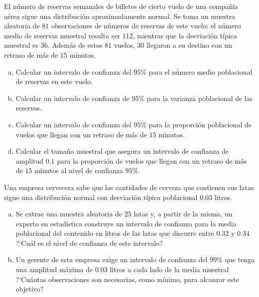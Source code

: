 \documentclass[12pt]{article}
\begin{document}
\begin{prob}
El número de reservas semanales de billetes de cierto vuelo de una compañía aérea sigue una
distribución aproximadamente normal. Se toma un muestra aleatoria de $81$ observaciones de
números de reservas de este vuelo: el número medio de reservas muestral resulta ser $112$,
mientras que la desviación típica muestral es  $36$. Además de estos $81$ vuelos, $30$
llegaron a su destino con un retraso de más de $15$ minutos.
\begin{enumerate}[a)]
    \item Calcular un intervalo de confianza del $95\%$ para el número medio
    poblacional de reservas en este vuelo.
    \item Calcular un intervalo de confianza de $95\%$ para la varianza
    poblacional de las reservas.
    \item Calcular un intervalo de confianza del $95\%$ para la proporción
    poblacional de vuelos que llegan con un retraso de más de $15$ minutos.
     \item Calcular el tamaño muestral que asegura un intervalo de
     confianza de amplitud $0.1$ para la proporción de vuelos que llegan
     con un retraso de más de $15$ minutos al nivel de confianza $95\%$.
\end{enumerate}
\end{prob}

\begin{prob}
    Una empresa cervecera sabe que las cantidades de cerveza que contienen
sus latas sigue una distribución normal con desviación típica poblacional $0.03$ litros.
\begin{enumerate}[a)]
    \item Se extrae una muestra aleatoria de $25$ latas y, a partir de la
    misma, un experto en estadística construye un  intervalo de confianza
    para la media poblacional del contenido en litros de las latas que
    discurre entre $0.32$ y $0.34$ ?`Cuál es el nivel de confianza de este
    intervalo?
    \item Un gerente de esta empresa exige un intervalo de confianza del
    $99\%$  que tenga una amplitud máxima de $0.03$ litros a cada lado de la
    media  muestral ?`Cuántas observaciones son necesarias, como mínimo,
    para alcanzar este objetivo?
\end{enumerate}
\end{prob}
\newpage
\end{document}
